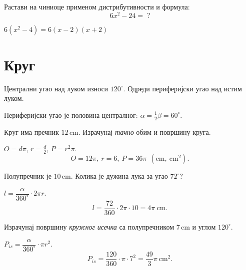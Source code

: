 \documentclass[11pt,a5paper,twoside,addpoints,noanswers]{exam} %
\newcommand{\measure}[2]{#1\,\mathrm{#2}}
\newcommand{\variant}[3]{#1}
\begin{document}
\begin{questions}
\question[4]
Растави на чиниоце применом дистрибутивности и формула:
\[
\variant{
6x^2-24= \;?
}{
12a^2+18a= \;?
}{
9m^2-4n^2= \;?
}
\]
\begin{solution}[\stretch 2]
\variant{
$6(x^2-4)=6(x-2)(x+2)$
}{
$6a(2a+3)$
}{
$(3m-2n)(3m+2n)$.
}
\end{solution}

\ifprintanswers\else\section*{Круг}\fi

\question[2]
Централни угао над луком износи
\(\variant{120^\circ}{150^\circ}{90^\circ}\).
Одреди периферијски угао над истим луком.
\begin{solution}[\stretch 1]
Периферијски угао је половина централног: 
\(\alpha=\tfrac{1}{2}\beta=
\variant{60^\circ}{75^\circ}{45^\circ}\).
\end{solution}

\question[3]
Круг има пречник
\(\variant{\measure{12}{cm}}{\measure{9}{cm}}{\measure{14}{cm}}\).
Израчунај \emph{тачно} обим и површину круга.
\begin{solution}[\stretch 2]
$O=d\pi$, $r=\frac d2$, $P=r^2\pi$.
\[
\variant{
O=12\pi,\ r=6,\ P=36\pi
}{
O=9\pi,\ r=4{,}5,\ P=\frac{81}{4}\pi
}{
O=14\pi,\ r=7,\ P=49\pi
}\ \ (\mathrm{cm},\ \mathrm{cm}^2).
\]
\end{solution}

\ifprintanswers\else\newpage\fi

\question[3]
Полупречник је
\(\variant{\measure{10}{cm}}{\measure{8}{cm}}{\measure{6}{cm}}\).
Колика је дужина лука за угао
\(\variant{72^\circ}{135^\circ}{30^\circ}\)?
\begin{solution}[\stretch 2]
$l=\dfrac{\alpha}{360^\circ}\cdot 2\pi r$.
\[
\variant{
l=\frac{72}{360}\cdot 2\pi\cdot 10
=4\pi\ \mathrm{cm}
}{
l=\frac{135}{360}\cdot 2\pi\cdot 8
=6\pi\ \mathrm{cm}
}{
l=\frac{30}{360}\cdot 2\pi\cdot 6
=\pi\ \mathrm{cm}
}.
\]
\end{solution}

\question[3]
Израчунај површину \emph{кружног исечка} са полупречником
\(\variant{\measure{7}{cm}}{\measure{9}{cm}}{\measure{5}{cm}}\)
и углом
\(\variant{120^\circ}{45^\circ}{150^\circ}\).
\begin{solution}[\stretch 2]
$P_{is}=\dfrac{\alpha}{360^\circ}\cdot \pi r^2$.
\[
\variant{
P_{is}=\frac{120}{360}\cdot \pi\cdot 7^2
=\frac{49}{3}\pi
}{
P_{is}=\frac{45}{360}\cdot \pi\cdot 9^2
=\frac{81}{8}\pi
}{
P_{is}=\frac{150}{360}\cdot \pi\cdot 5^2
=\frac{125}{12}\pi
}\ \mathrm{cm}^2.
\]
\end{solution}


\end{questions}
\end{document}
